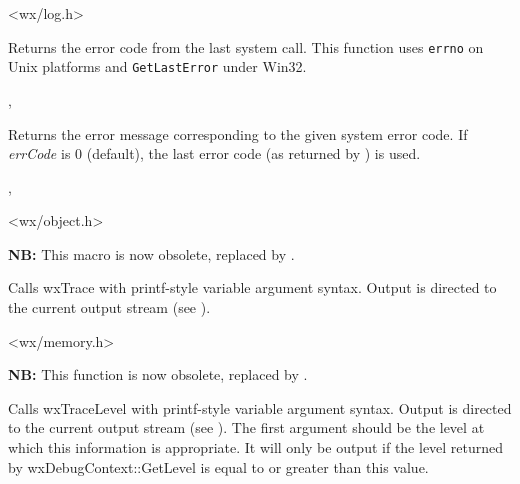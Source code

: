 



<wx/log.h>


\label{wxsyserrorcode}


Returns the error code from the last system call. This function uses
{\tt errno} on Unix platforms and {\tt GetLastError} under Win32.


,


\label{wxsyserrormsg}


Returns the error message corresponding to the given system error code. If
{\it errCode} is $0$ (default), the last error code (as returned by
) is used.


,


\label{trace}


<wx/object.h>


{\bf NB:} This macro is now obsolete, replaced by .

Calls wxTrace with printf-style variable argument syntax. Output
is directed to the current output stream (see ).


<wx/memory.h>


\label{tracelevel}


{\bf NB:} This function is now obsolete, replaced by .

Calls wxTraceLevel with printf-style variable argument syntax. Output
is directed to the current output stream (see ).
The first argument should be the level at which this information is appropriate.
It will only be output if the level returned by wxDebugContext::GetLevel is equal to or greater than
this value.

